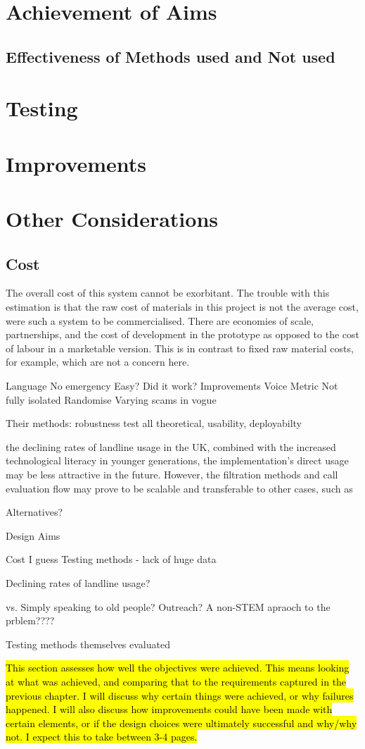 \documentclass[main.tex]{subfiles}
\begin{document}
\section{Achievement of Aims}
\subsection{Effectiveness of Methods used and Not used}
\section{Testing}
\section{Improvements}
\section{Other Considerations}

\subsection{Cost}
The overall cost of this system cannot be exorbitant. The trouble with this estimation is that the raw cost of materials in this project is not the average cost, were such a system to be commercialised. There are economies of scale, partnerships, and the cost of development in the prototype as opposed to the cost of labour in a marketable version. This is in contrast to fixed raw material costs, for example, which are not a concern here.

Language
No emergency
Easy?
Did it work?
Improvements
Voice Metric
Not fully isolated
Randomise
Varying scams in vogue

Their methods: robustness test all theoretical, usability, deployabilty

the declining rates of landline usage in the UK, combined with the increased technological literacy in younger generations, the implementation’s direct usage may be less attractive in the future. However, the filtration methods and call evaluation flow may prove to be scalable and transferable to other cases, such as

Alternatives?

Design Aims

Cost I guess
Testing methods - lack of huge data

Declining rates of landline usage?

vs. Simply speaking to old people? Outreach? A non-STEM apraoch to the prblem????


Testing methods themselves evaluated

\hl{This section assesses how well the objectives were achieved. This means looking at what was achieved, and comparing that to the requirements captured in the previous chapter. I will discuss why certain things were achieved, or why failures happened. I will also discuss how improvements could have been made with certain elements, or if the design choices were ultimately successful and why/why not. I expect this to take between 3-4 pages.}
\end{document}
